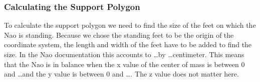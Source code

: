 \documentclass[a4paper]{article}
\begin{document}
\subsubsection{Calculating the Support Polygon}
To calculate the support polygon we need to find the size of the feet on which the Nao is standing. Because we chose the standing feet to be the origin of the coordinate system, the length and width of the feet have to be added to find the size. In the Nao documentation this accounts to \dots by \dots centimeter. This means that the Nao is in balance when the x value of the center of mass is between 0 and \dots and the y value is between 0 and \dots. The z value does not matter here.



\end{document}
